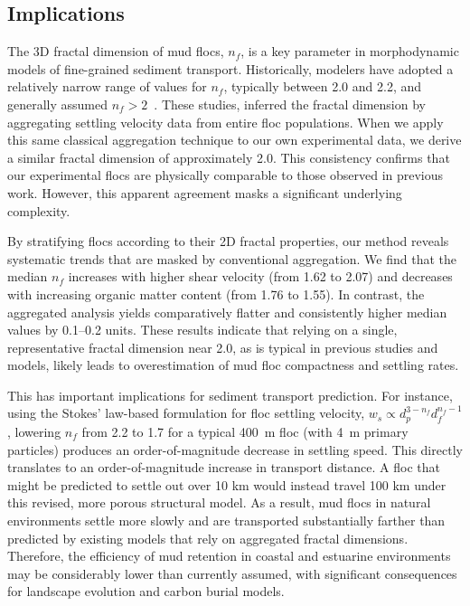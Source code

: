 \documentclass{agujournal2019}
\begin{document}
\subsection{Implications}

The 3D fractal dimension of mud flocs, $n_f$, is a key parameter in morphodynamic models of fine-grained sediment transport. Historically, modelers have adopted a relatively narrow range of values for $n_f$, typically between 2.0 and 2.2, and generally assumed $n_f > 2$~\cite{kranenburg1994fractal, son2008flocculation, winterwerp1998simple, winterwerp2004introduction, winterwerp2006heuristic}. These studies, inferred the fractal dimension by aggregating settling velocity data from entire floc populations. When we apply this same classical aggregation technique to our own experimental data, we derive a similar fractal dimension of approximately 2.0. This consistency confirms that our experimental flocs are physically comparable to those observed in previous work. However, this apparent agreement masks a significant underlying complexity.

By stratifying flocs according to their 2D fractal properties, our method reveals systematic trends that are masked by conventional aggregation. We find that the median $n_f$ increases with higher shear velocity (from 1.62 to 2.07) and decreases with increasing organic matter content (from 1.76 to 1.55). In contrast, the aggregated analysis yields comparatively flatter and consistently higher median values by 0.1--0.2 units. These results indicate that relying on a single, representative fractal dimension near 2.0, as is typical in previous studies and models, likely leads to overestimation of mud floc compactness and settling rates.

This has important implications for sediment transport prediction. For instance, using the Stokes' law-based formulation for floc settling velocity, \( w_s \propto d_p^{3-n_f} d_f^{n_f-1} \), lowering \( n_f \) from 2.2 to 1.7 for a typical 400~\textmu m floc (with 4~\textmu m primary particles) produces an order-of-magnitude decrease in settling speed. This directly translates to an order-of-magnitude increase in transport distance. A floc that might be predicted to settle out over 10 km would instead travel 100 km under this revised, more porous structural model. As a result, mud flocs in natural environments settle more slowly and are transported substantially farther than predicted by existing models that rely on aggregated fractal dimensions. Therefore, the efficiency of mud retention in coastal and estuarine environments may be considerably lower than currently assumed, with significant consequences for landscape evolution and carbon burial models.
\end{document}
